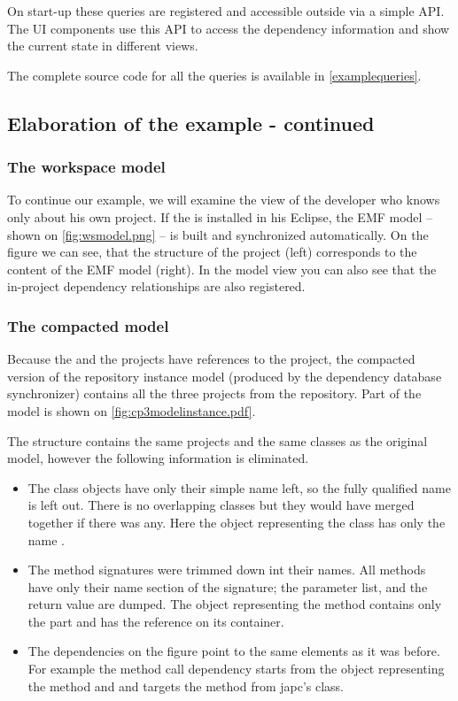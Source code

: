 On start-up these queries are registered and accessible outside via a simple API.
The UI components use this API to access the dependency information and show the
current state in different views.

The complete source code for all the queries is available in \autoref{examplequeries}.


\subsection{Elaboration of the example - continued}\label{sect:elabex2}
\subsubsection{The workspace model}
To continue our example, we will examine the view of the developer who knows
only about his own  project. If the \ptool{} is  installed in his
Eclipse, the EMF model -- shown on \autoref{fig:wsmodel.png}
-- is built and synchronized automatically. On the figure we can see, that the
structure of the project (left) corresponds to the content of the EMF model
(right). In the model view you can also see that the in-project dependency
relationships are also registered.


\subsubsection{The compacted model}
Because the  and the  projects have
references to the  project, the compacted version of the repository instance model (produced by the
dependency database synchronizer) contains all the three projects from the
repository. Part of the model is shown on
\autoref{fig:cp3modelinstance.pdf}.

The structure contains the same projects and the same
classes as the original model, however the following information is eliminated.
\begin{itemize}
  \item The class objects have only their simple name left, so the fully qualified name is left out.
There is no overlapping classes but they would have merged together if
there was any. Here the object representing the  class has only the name
.
  \item The method signatures were trimmed down int their names. All methods have only their 
name section of the signature; the parameter list, and the return value are dumped.    
The object representing the 
method contains only the  part and has the reference on
its container.
  \item The dependencies on the figure point to the same elements as it was
  before. For example the method call dependency starts from the object
  representing the   method
  and and targets the  method from japc's
   class.
\end{itemize}


